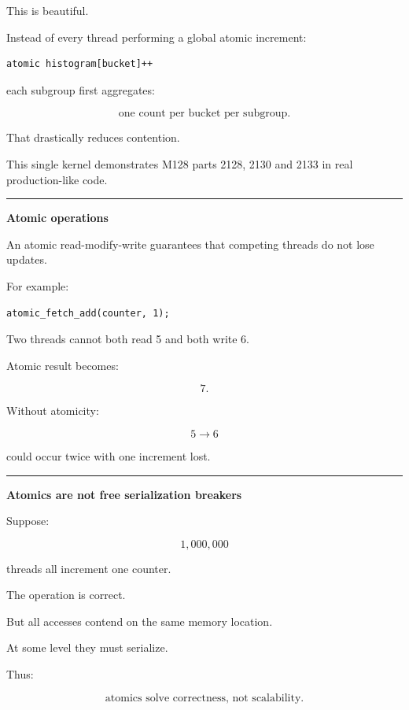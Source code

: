This is beautiful.

Instead of every thread performing a global atomic increment:

\protect{}\label{nh6bpq}%
\begin{verbatim}
atomic histogram[bucket]++
\end{verbatim}

each subgroup first aggregates:

\[
\boxed{
\text{one count per bucket per subgroup}.
}
\]

That drastically reduces contention.

This single kernel demonstrates M128 parts 2128, 2130 and 2133 in real production-like code.

\begin{center}\rule{0.5\linewidth}{0.5pt}\end{center}

\textbf{Atomic operations}

An atomic read-modify-write guarantees that competing threads do not lose updates.

For example:

\protect{}\label{xpapkm}%
\begin{verbatim}
atomic_fetch_add(counter, 1);
\end{verbatim}

Two threads cannot both read 5 and both write 6.

Atomic result becomes:

\[
7.
\]

Without atomicity:

\[
5\rightarrow6
\]

could occur twice with one increment lost.

\begin{center}\rule{0.5\linewidth}{0.5pt}\end{center}

\textbf{Atomics are not free serialization breakers}

Suppose:

\[
1,000,000
\]

threads all increment one counter.

The operation is correct.

But all accesses contend on the same memory location.

At some level they must serialize.

Thus:

\[
\boxed{
\text{atomics solve correctness, not scalability}.
}
\]

